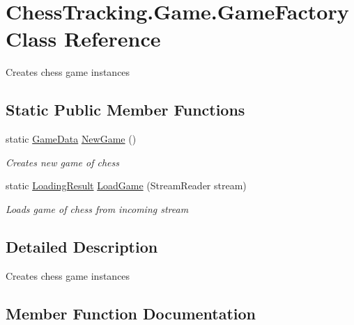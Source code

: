 \hypertarget{class_chess_tracking_1_1_game_1_1_game_factory}{}\section{Chess\+Tracking.\+Game.\+Game\+Factory Class Reference}
\label{class_chess_tracking_1_1_game_1_1_game_factory}


Creates chess game instances  


\subsection*{Static Public Member Functions}
\begin{DoxyCompactItemize}
\item 
static \mbox{\hyperlink{class_chess_tracking_1_1_game_1_1_game_data}{Game\+Data}} \mbox{\hyperlink{class_chess_tracking_1_1_game_1_1_game_factory_a17de3986c1f9ab34cb6184f22b48dec1}{New\+Game}} ()
\begin{DoxyCompactList}\small\item\em Creates new game of chess \end{DoxyCompactList}\item 
static \mbox{\hyperlink{class_chess_tracking_1_1_game_1_1_loading_result}{Loading\+Result}} \mbox{\hyperlink{class_chess_tracking_1_1_game_1_1_game_factory_a71492ef5f1d0d579b275e0521858abf6}{Load\+Game}} (Stream\+Reader stream)
\begin{DoxyCompactList}\small\item\em Loads game of chess from incoming stream \end{DoxyCompactList}\end{DoxyCompactItemize}


\subsection{Detailed Description}
Creates chess game instances 



\subsection{Member Function Documentation}
\mbox{\label{class_chess_tracking_1_1_game_1_1_game_factory_a71492ef5f1d0d579b275e0521858abf6}} 
